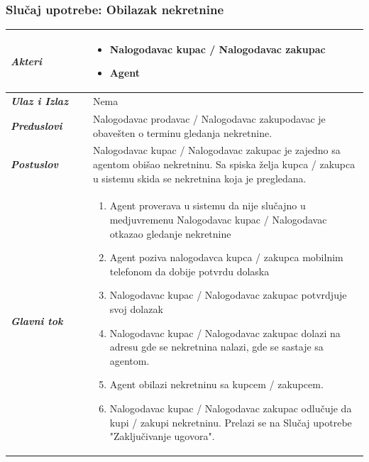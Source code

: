\documentclass[20pt]{article}
\begin{document}
\subsubsection{\bfseries \large Slu\v{c}aj upotrebe: Obilazak nekretnine}
\begin{center}
\begin{longtable}{p{0.23\linewidth} p{0.77\linewidth}}
 \hline
 {\it \bfseries Akteri} & \begin{itemize}
    \item Nalogodavac kupac / Nalogodavac zakupac
    \item Agent
\end{itemize}\\
\hline

 {\it \bfseries Ulaz i Izlaz} & Nema\\   
 \hline
 \hline
 {\it \bfseries Preduslovi} & Nalogodavac prodavac / Nalogodavac zakupodavac je obave\v sten o terminu gledanja nekretnine.\\
 \hline
 
 {\it \bfseries Postuslov} & Nalogodavac kupac / Nalogodavac zakupac je zajedno sa agentom obi\v sao nekretninu. Sa spiska \v zelja kupca / zakupca u sistemu skida se nekretnina koja je pregledana.\\
 \hline


     {\it \bfseries Glavni tok} &  
     \begin{enumerate}
         \item  Agent proverava u sistemu da nije slu\v cajno u medjuvremenu Nalogodavac kupac / Nalogodavac otkazao gledanje nekretnine
         \item  Agent poziva nalogodavca kupca / zakupca mobilnim telefonom da dobije potvrdu dolaska
         \item  Nalogodavac kupac / Nalogodavac zakupac potvrdjuje svoj dolazak
         \item  Nalogodavac kupac / Nalogodavac zakupac dolazi na adresu gde se nekretnina nalazi, gde se sastaje sa agentom.
         \item Agent obilazi nekretninu sa kupcem / zakupcem.
         \item Nalogodavac kupac / Nalogodavac zakupac odlu\v cuje da kupi / zakupi nekretninu. Prelazi se na Slu\v{c}aj upotrebe "Zaklju\v civanje ugovora".
    \end{enumerate}\\ 
\hline
\end{longtable}
\end{center} 
\end{document}
